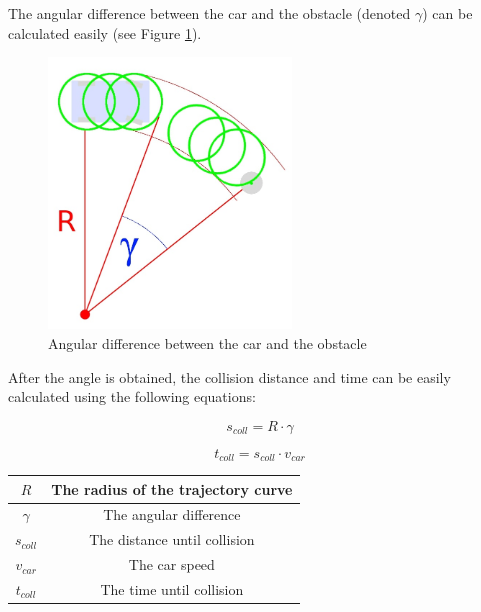 The angular difference between the car and the obstacle (denoted $\gamma$) can be calculated easily (see Figure \ref{static_collision_time_check_angle}).

\begin{figure}[!ht]
    \centering
    \includegraphics[height=72mm]{figures/raw/jpeg/static_collision_time_check_angle.jpg}
    \caption{Angular difference between the car and the obstacle}
    \label{static_collision_time_check_angle}
\end{figure}

After the angle is obtained, the collision distance and time can be easily calculated using the following equations:

\begin{equation}\label{eq:collision_dist}
s_{coll} = R \cdot \gamma
\end{equation}

\begin{equation}\label{eq:collision_time}
t_{coll} = s_{coll} \cdot v_{car}
\end{equation}

\begin{center}
    \begin{tabular}{ | c | c | }
        \hline
        $R$         & The radius of the trajectory curve    \\
        \hline
        $\gamma$    & The angular difference                \\
        \hline
        $s_{coll}$  & The distance until collision          \\
        \hline
        $v_{car}$   & The car speed                         \\
        \hline 
        $t_{coll}$  & The time until collision              \\
        \hline
    \end{tabular}
\end{center}

